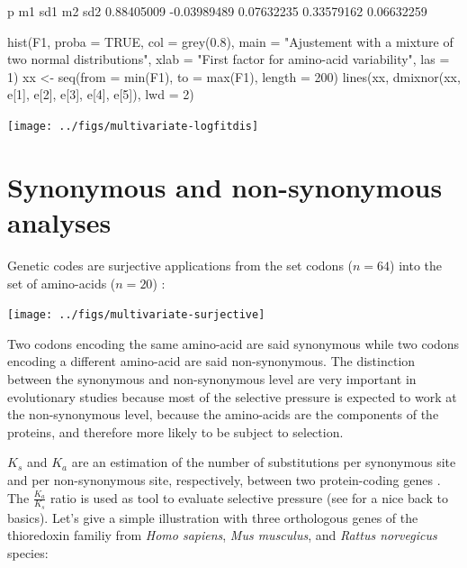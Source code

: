\documentclass{article}
\begin{document}
\begin{Schunk}
\begin{Soutput}
          p          m1         sd1          m2         sd2 
 0.88405009 -0.03989489  0.07632235  0.33579162  0.06632259 
\end{Soutput}
\begin{Sinput}
 hist(F1, proba = TRUE, col = grey(0.8), main = "Ajustement with a mixture of two normal distributions", 
     xlab = "First factor for amino-acid variability", las = 1)
 xx <- seq(from = min(F1), to = max(F1), length = 200)
 lines(xx, dmixnor(xx, e[1], e[2], e[3], e[4], e[5]), lwd = 2)
\end{Sinput}
\end{Schunk}
\texttt{[image: ../figs/multivariate-logfitdis]}

\section{Synonymous and non-synonymous analyses}

Genetic codes are surjective applications from the set codons ($n=64$)
into the set of amino-acids ($n=20$) :

\texttt{[image: ../figs/multivariate-surjective]}

Two codons encoding the same amino-acid are said synonymous while
two codons encoding a different amino-acid are said non-synonymous.
The distinction between the synonymous and non-synonymous level are
very important in evolutionary studies because most of the selective
pressure is expected to work at the non-synonymous level, because the
amino-acids are the components of the proteins, and therefore more likely
to be subject to selection.

$K_s$ and $K_a$ are an estimation of the number of substitutions per synonymous site 
and per non-synonymous site, respectively, between two protein-coding genes \cite{kaks}.
The $$ ratio is used as tool to evaluate selective pressure (see \cite{hurst}
for a nice back to basics). Let's give a simple illustration with three orthologous genes of the 
thioredoxin familiy from \textit{Homo sapiens}, \textit{Mus musculus},
and \textit{Rattus norvegicus} species: 
\end{document}

